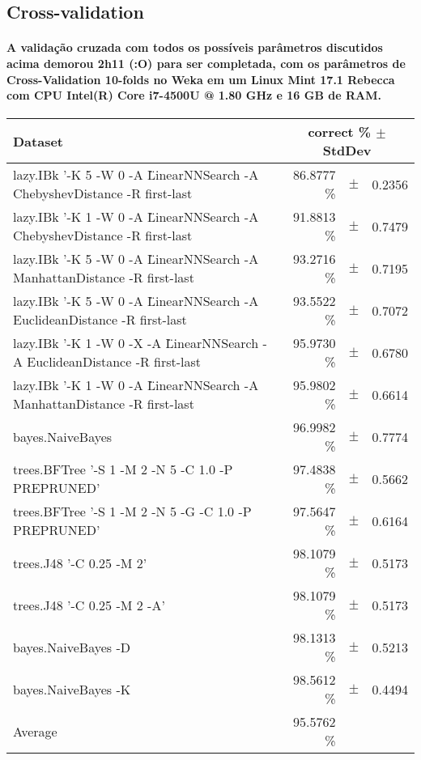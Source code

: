 \documentclass[a4paper,10pt]{article}
\theoremstyle{plain}
\begin{document}
\subsection{Cross-validation}

\paragraph{
  A validação cruzada com todos os possíveis parâmetros discutidos acima demorou 2h11 (:O) para ser
  completada, com os parâmetros de Cross-Validation 10-folds no Weka em um Linux Mint 17.1 Rebecca
  com CPU Intel(R) Core i7-4500U @ 1.80 GHz e 16 GB de RAM.
}

\begin{table}[thb]
\scriptsize
{\centering \begin{tabular}{lr@{\hspace{0cm}}c@{\hspace{0cm}}r}
\\
\hline
Dataset & \multicolumn{3}{c}{correct \% $\pm$ StdDev}\\
\hline
lazy.IBk '-K 5 -W 0 -A \" LinearNNSearch -A ChebyshevDistance -R first-last & 86.8777 \% & $\pm$ & 0.2356\\
lazy.IBk '-K 1 -W 0 -A \" LinearNNSearch -A ChebyshevDistance -R first-last & 91.8813 \% & $\pm$ & 0.7479\\
lazy.IBk '-K 5 -W 0 -A \" LinearNNSearch -A ManhattanDistance -R first-last & 93.2716 \% & $\pm$ & 0.7195\\
lazy.IBk '-K 5 -W 0 -A \" LinearNNSearch -A EuclideanDistance -R first-last & 93.5522 \% & $\pm$ & 0.7072\\
lazy.IBk '-K 1 -W 0 -X -A \" LinearNNSearch -A EuclideanDistance -R first-last & 95.9730 \% & $\pm$ & 0.6780\\
lazy.IBk '-K 1 -W 0 -A \" LinearNNSearch -A ManhattanDistance -R first-last & 95.9802 \% & $\pm$ & 0.6614\\
bayes.NaiveBayes & 96.9982 \% & $\pm$ & 0.7774\\
trees.BFTree '-S 1 -M 2 -N 5 -C 1.0 -P PREPRUNED' & 97.4838 \% & $\pm$ & 0.5662\\
trees.BFTree '-S 1 -M 2 -N 5 -G -C 1.0 -P PREPRUNED' & 97.5647 \% & $\pm$ & 0.6164\\
trees.J48 '-C 0.25 -M 2' & 98.1079 \% & $\pm$ & 0.5173\\
trees.J48 '-C 0.25 -M 2 -A' & 98.1079 \% & $\pm$ & 0.5173\\
bayes.NaiveBayes -D & 98.1313 \% & $\pm$ & 0.5213\\
bayes.NaiveBayes -K & 98.5612 \% & $\pm$ & 0.4494\\
\hline
Average & 95.5762 \% &       &       \\
\hline
\end{tabular} \scriptsize \par}
\end{table}
\end{document}
